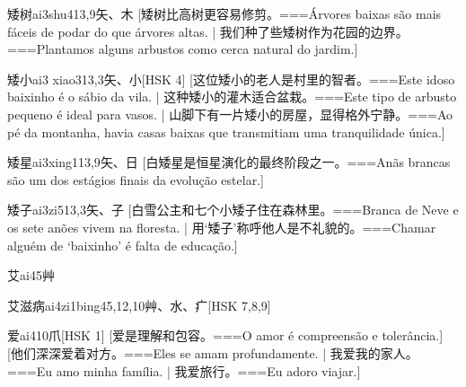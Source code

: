 \begin{EntryWithPhonetic}{矮树}{ai3shu4}{13,9}{⽮、⽊}
  [矮树比高树更容易修剪。===Árvores baixas são mais fáceis de podar do que árvores altas. | 我们种了些矮树作为花园的边界。===Plantamos alguns arbustos como cerca natural do jardim.]
\end{EntryWithPhonetic}

\begin{EntryWithPhonetic}{矮小}{ai3 xiao3}{13,3}{⽮、⼩}[HSK 4]
  [这位矮小的老人是村里的智者。===Este idoso baixinho é o sábio da vila. | 这种矮小的灌木适合盆栽。===Este tipo de arbusto pequeno é ideal para vasos. | 山脚下有一片矮小的房屋，显得格外宁静。===Ao pé da montanha, havia casas baixas que transmitiam uma tranquilidade única.]
\end{EntryWithPhonetic}

\begin{EntryWithPhonetic}{矮星}{ai3xing1}{13,9}{⽮、⽇}
  [白矮星是恒星演化的最终阶段之一。===Anãs brancas são um dos estágios finais da evolução estelar.]
\end{EntryWithPhonetic}

\begin{EntryWithPhonetic}{矮子}{ai3zi5}{13,3}{⽮、⼦}
  [白雪公主和七个小矮子住在森林里。===Branca de Neve e os sete anões vivem na floresta. | 用`矮子'称呼他人是不礼貌的。===Chamar alguém de `baixinho' é falta de educação.]
\end{EntryWithPhonetic}

\begin{EntryWithPhonetic}{艾}{ai4}{5}{⾋}
\end{EntryWithPhonetic}

\begin{EntryWithPhonetic}{艾滋病}{ai4zi1bing4}{5,12,10}{⾋、⽔、⽧}[HSK 7,8,9]
\end{EntryWithPhonetic}

\begin{EntryWithPhonetic}{爱}{ai4}{10}{⽖}[HSK 1]
  [爱是理解和包容。===O amor é compreensão e tolerância.]
  [他们深深爱着对方。===Eles se amam profundamente. | 我爱我的家人。===Eu amo minha família. | 我爱旅行。===Eu adoro viajar.]
\end{EntryWithPhonetic}

